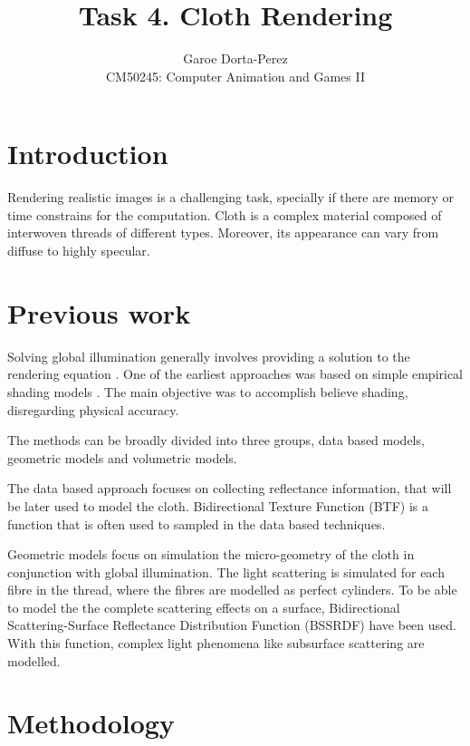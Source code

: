 \documentclass[12pt]{article}
\begin{document}
  
\title{Task 4. Cloth Rendering}
\author{Garoe Dorta-Perez\\
CM50245: Computer Animation and Games II}
 
\maketitle
 
\section{Introduction}

Rendering realistic images is a challenging task, specially if there are memory or time constrains for the computation.
Cloth is a complex material composed of interwoven threads of different types.
Moreover, its appearance can vary from diffuse to highly specular.

\section{Previous work}

Solving global illumination generally involves providing a solution to the rendering equation \cite{Kajiya1986}.
One of the earliest approaches was based on simple empirical shading models \cite{Weft1986}.
The main objective was to accomplish believe shading, disregarding physical accuracy.

The methods can be broadly divided into three groups, data based models, geometric models and volumetric models.

The data based approach focuses on collecting reflectance information, that will be later used to model the cloth.
Bidirectional Texture Function (BTF) \cite{Dana1999} is a function that is often used to sampled in the data based techniques.

Geometric models focus on simulation the micro-geometry of the cloth in conjunction with global illumination.
The light scattering is simulated for each fibre in the thread, where the fibres are modelled as perfect cylinders.
To be able to model the the complete scattering effects on a surface, Bidirectional Scattering-Surface Reflectance Distribution Function (BSSRDF) \cite{NicodemusFredEandRichmond1977} have been used.
With this function, complex light phenomena like subsurface scattering are modelled.

\section{Methodology}
\end{document}
